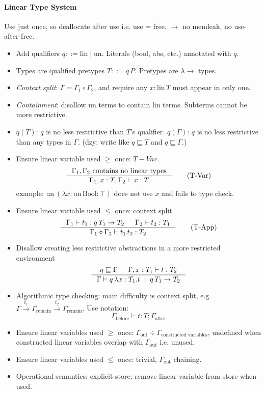 \documentclass{article}
\newcommand{\TBool}{\text{Bool}}
\begin{document}
\paragraph{Linear Type System}
  Use just once, so deallocate after use i.e. use = free. $\to$ no memleak, no use-after-free.
  \begin{itemize}
    \item Add qualifiers $q ::= \text{lin} \;|\; \text{un}$. Literals (bool, abs, etc.) annotated with $q$.
    \item Types are qualified pretypes $T ::= q\, P$. Pretypes are $\lambda{\to}$ types.
    \item \emph{Context split}: $\Gamma = \Gamma_1 \circ \Gamma_2$, and require any $x: \text{lin}\, T$ must appear in only one.
    \item \emph{Containment}: disallow $\text{un}$ terms to contain $\text{lin}$ terms. Subterms cannot be more restrictive.
    \item $q(T)$: $q$ is no less restrictive than $T$'s qualifier. $q(\Gamma)$: $q$ is no less restrictive than any types in $\Gamma$.
      (dzy; write like $q \sqsubseteq T$ and $q \sqsubseteq \Gamma$.)
    \item Ensure linear variable used $\ge$ once: $T-Var$.
\[
  \inference{\Gamma_1, \Gamma_2 \text{ contains no linear types}}
            {\Gamma_1, x:T, \Gamma_2\vdash x:T}
            \tag{T-Var}
\]
      example: $\text{un}~(\lambda x:\text{un}\, \TBool:\top)$ does not use $x$ and fails to type check.
    \item Ensure linear variable used $\le$ once: context split
\[
  \inference{\Gamma_1\vdash t_1: q\, T_1\to T_2 & \Gamma_2 \vdash t_2: T_1}
            {\Gamma_1 \circ \Gamma_2 \vdash t_1\, t_2:T_2}
            \tag{T-App}
\]
    \item Disallow creating less restrictive abstractions in a more restricted environment
\[
  \inference{
    q \sqsubseteq \Gamma & \Gamma, x:T_1 \vdash t: T_2
  }{
    \Gamma \vdash q\, \lambda x:T_1.t \;:\;q \, T_1\to T_2
  }
\]
    \item Algorithmic type checking: main difficulty is context split,
      e.g. $\Gamma \xrightarrow{t_1} \Gamma_{\text{remain}} \xrightarrow{t_2} \Gamma_{\text{remain}}$.
      Use notation:
\[
    \Gamma_{\text{before}} \vdash t:T ; \Gamma_{\text{after}}
\]
    \item Ensure linear variables used $\ge$ once: $\Gamma_{\text{out}} \div \Gamma_{\text{constructed variables}}$, undefined when constructed linear variables overlap with $\Gamma_{\text{out}}$ i.e. unused.
    \item Ensure linear variables used $\le$ once: trivial, $\Gamma_{\text{out}}$ chaining.
    \item Operational semantics: explicit store; remove linear variable from store when used.
  \end{itemize}
\end{document}

